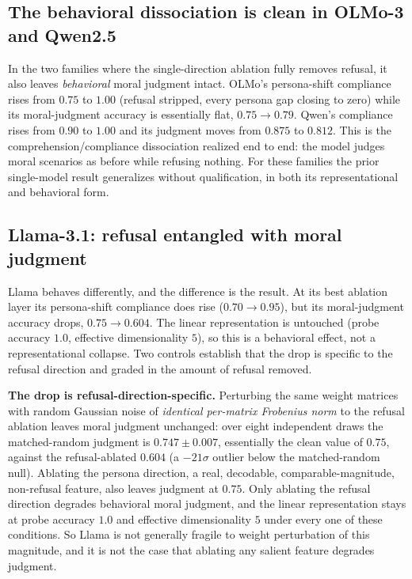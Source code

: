 \subsection{The behavioral dissociation is clean in OLMo-3 and Qwen2.5}\label{the-behavioral-dissociation-is-clean-in-olmo-3-and-qwen2.5}

In the two families where the single-direction ablation fully removes refusal, it
also leaves \emph{behavioral} moral judgment intact. OLMo's persona-shift compliance
rises from \(0.75\) to \(1.00\) (refusal stripped, every persona gap closing to zero)
while its moral-judgment accuracy is essentially flat, \(0.75 \to 0.79\). Qwen's
compliance rises from \(0.90\) to \(1.00\) and its judgment moves from \(0.875\) to
\(0.812\). This is the comprehension/compliance dissociation realized end to end:
the model judges moral scenarios as before while refusing nothing. For these
families the prior single-model result generalizes without qualification, in both
its representational and behavioral form.

\subsection{Llama-3.1: refusal entangled with moral judgment}\label{llama-3.1-refusal-entangled-with-moral-judgment}

Llama behaves differently, and the difference is the result. At its best ablation
layer its persona-shift compliance does rise (\(0.70 \to 0.95\)), but its
moral-judgment accuracy drops, \(0.75 \to 0.604\). The linear representation is
untouched (probe accuracy \(1.0\), effective dimensionality \(5\)), so this is a
behavioral effect, not a representational collapse. Two controls establish that
the drop is specific to the refusal direction and graded in the amount of refusal
removed.

\textbf{The drop is refusal-direction-specific.} Perturbing the same weight matrices
with random Gaussian noise of \emph{identical per-matrix Frobenius norm} to the refusal
ablation leaves moral judgment unchanged: over eight independent draws the
matched-random judgment is \(0.747 \pm 0.007\), essentially the clean value of
\(0.75\), against the refusal-ablated \(0.604\) (a \(-21\sigma\) outlier below the
matched-random null). Ablating the persona direction, a real, decodable,
comparable-magnitude, non-refusal feature, also leaves judgment at \(0.75\). Only
ablating the refusal direction degrades behavioral moral judgment, and the linear
representation stays at probe accuracy \(1.0\) and effective dimensionality \(5\) under
every one of these conditions. So Llama is not generally fragile to weight
perturbation of this magnitude, and it is not the case that ablating any salient
feature degrades judgment.

